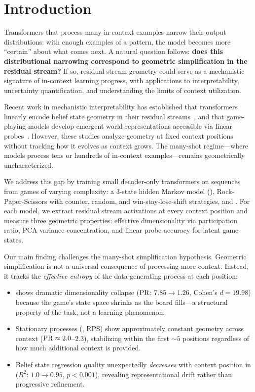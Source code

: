 \section{Introduction}
\label{sec:intro}

Transformers that process many in-context examples narrow their output distributions: with enough examples of a pattern, the model becomes more ``certain'' about what comes next. A natural question follows: {\bf does this distributional narrowing correspond to geometric simplification in the residual stream?} If so, residual stream geometry could serve as a mechanistic signature of in-context learning progress, with applications to interpretability, uncertainty quantification, and understanding the limits of context utilization.

Recent work in mechanistic interpretability has established that transformers linearly encode belief state geometry in their residual streams~\cite{shai2024transformers}, and that game-playing models develop emergent world representations accessible via linear probes~\cite{nanda2023emergent, li2023emergent}. However, these studies analyze geometry at fixed context positions without tracking how it evolves as context grows. The many-shot regime---where models process tens or hundreds of in-context examples---remains geometrically uncharacterized.

We address this gap by training small decoder-only transformers on sequences from games of varying complexity: a 3-state hidden Markov model (\messthree), Rock-Paper-Scissors with counter, random, and win-stay-lose-shift strategies, and \ttt. For each model, we extract residual stream activations at every context position and measure three geometric properties: effective dimensionality via participation ratio, PCA variance concentration, and linear probe accuracy for latent game states.

Our main finding challenges the many-shot simplification hypothesis. Geometric simplification is not a universal consequence of processing more context. Instead, it tracks the \emph{effective entropy} of the data-generating process at each position:
\begin{itemize}[leftmargin=*,itemsep=0pt,topsep=0pt]
    \item \ttt shows dramatic dimensionality collapse ($\mathrm{PR}$: $7.85 \to 1.26$, Cohen's $d = 19.98$) because the game's state space shrinks as the board fills---a structural property of the task, not a learning phenomenon.
    \item Stationary processes (\messthree, RPS) show approximately constant geometry across context ($\mathrm{PR} \approx 2.0$--$2.3$), stabilizing within the first ${\sim}5$ positions regardless of how much additional context is provided.
    \item Belief state regression quality unexpectedly \emph{decreases} with context position in \messthree ($R^2$: $1.0 \to 0.95$, $p < 0.001$), revealing representational drift rather than progressive refinement.
\end{itemize}

